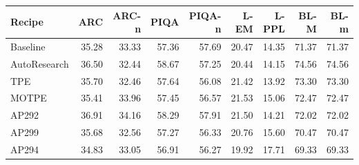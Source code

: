 \begin{tabular}{lrrrrrrrr}
\toprule
Recipe & ARC & ARC-n & PIQA & PIQA-n & L-EM & L-PPL & BL-M & BL-m \\
\midrule
Baseline & 35.28 & 33.33 & 57.36 & 57.69 & 20.47 & 14.35 & 71.37 & 71.37 \\
AutoResearch & 36.50 & 32.44 & 58.67 & 57.25 & 20.44 & 14.15 & 74.56 & 74.56 \\
TPE & 35.70 & 32.46 & 57.64 & 56.08 & 21.42 & 13.92 & 73.30 & 73.30 \\
MOTPE & 35.41 & 33.96 & 57.45 & 56.57 & 21.53 & 15.06 & 72.47 & 72.47 \\
AP292 & 36.91 & 34.16 & 58.29 & 57.91 & 21.50 & 14.21 & 72.02 & 72.02 \\
AP299 & 35.68 & 32.56 & 57.27 & 56.33 & 20.76 & 15.60 & 70.47 & 70.47 \\
AP294 & 34.83 & 33.05 & 56.91 & 56.27 & 19.92 & 17.71 & 69.33 & 69.33 \\
\bottomrule
\end{tabular}
